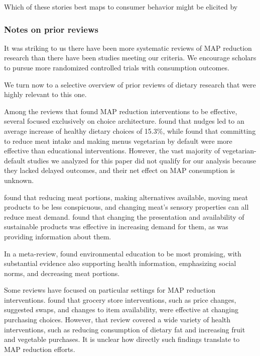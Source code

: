 \documentclass[sn-nature,referee,pdflatex]{sn-jnl}
\begin{document}
Which of these stories best maps to consumer behavior might be elicited
by

\subsubsection{Notes on prior reviews}\label{sec5.4.5}

It was striking to us there have been more systematic reviews of MAP
reduction research than there have been studies meeting our criteria. We
encourage scholars to pursue more randomized controlled trials with
consumption outcomes.

We turn now to a selective overview of prior reviews of dietary research
that were highly relevant to this one.

Among the reviews that found MAP reduction interventions to be
effective, several focused exclusively on choice architecture.
\citep{arno2016} found that nudges led to an average increase of healthy
dietary choices of 15.3\%, while \citep{byerly2018} found that
committing to reduce meat intake and making menus vegetarian by default
were more effective than educational interventions. However, the vast
majority of vegetarian-default studies we analyzed for this paper did
not qualify for our analysis because they lacked delayed outcomes, and
their net effect on MAP consumption is unknown.

\citep{bianchi2018restructuring} found that reducing meat portions,
making alternatives available, moving meat products to be less
conspicuous, and changing meat's sensory properties can all reduce meat
demand. \citep{pandey2023} found that changing the presentation and
availability of sustainable products was effective in increasing demand
for them, as was providing information about them.

In a meta-review, \citep{grundy2022} found environmental education to be
most promising, with substantial evidence also supporting health
information, emphasizing social norms, and decreasing meat portions.

Some reviews have focused on particular settings for MAP reduction
interventions. \citep{hartmannboyce2018} found that grocery store
interventions, such as price changes, suggested swaps, and changes to
item availability, were effective at changing purchasing choices.
However, that review covered a wide variety of health interventions,
such as reducing consumption of dietary fat and increasing fruit and
vegetable purchases. It is unclear how directly such findings translate
to MAP reduction efforts.
\end{document}

